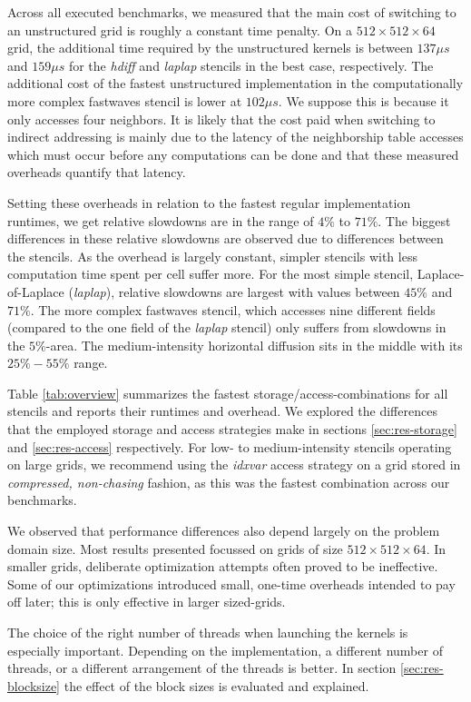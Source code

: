 Across all executed benchmarks, we measured that the main cost of switching to an unstructured grid is roughly a constant time penalty. On a $512\times 512\times 64$ grid, the additional time required by the unstructured kernels is between $137 \mu s$ and $159 \mu s$ for the \emph{hdiff} and \emph{laplap} stencils in the best case, respectively. The additional cost of the fastest unstructured implementation in the computationally more complex fastwaves stencil is lower at $102 \mu s$. We suppose this is because it only accesses four neighbors. It is likely that the cost paid when switching to indirect addressing is mainly due to the latency of the neighborship table accesses which must occur before any computations can be done and that these measured overheads quantify that latency.

Setting these overheads in relation to the fastest regular implementation runtimes, we get relative slowdowns are in the range of $4\%$ to $71\%$. The biggest differences in these relative slowdowns are observed due to differences between the stencils. As the overhead is largely constant, simpler stencils with less computation time spent per cell suffer more. For the most simple stencil, Laplace-of-Laplace (\emph{laplap}), relative slowdowns are largest with values between $45\%$ and $71\%$. The more complex fastwaves stencil, which accesses nine different fields (compared to the one field of the \emph{laplap} stencil) only suffers from slowdowns in the $5\%$-area. The medium-intensity horizontal diffusion sits in the middle with its $25\% - 55\%$ range. 

Table \ref{tab:overview} summarizes the fastest storage/access-combinations for all stencils and reports their runtimes and overhead. We explored the differences that the employed storage and access strategies make in sections \ref{sec:res-storage} and \ref{sec:res-access} respectively. For low- to medium-intensity stencils operating on large grids, we recommend using the \emph{idxvar} access strategy on a grid stored in \emph{compressed, non-chasing} fashion, as this was the fastest combination across our benchmarks. 

We observed that performance differences also depend largely on the problem domain size. Most results presented focussed on grids of size $512\times 512\times 64$. In smaller grids, deliberate optimization attempts often proved to be ineffective. Some of our optimizations introduced small, one-time overheads intended to pay off later; this is only effective in larger sized-grids.

The choice of the right number of threads when launching the kernels is especially important. Depending on the implementation, a different number of threads, or a different arrangement of the threads is better. In section \ref{sec:res-blocksize} the effect of the block sizes is evaluated and explained.